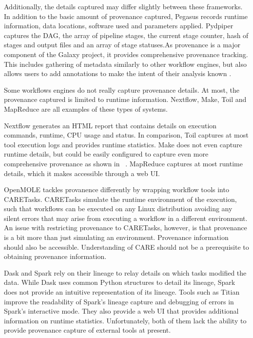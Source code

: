 \documentclass{report}
\begin{document}
            Additionally, the details captured may differ slightly between 
            these frameworks. In addition to the basic amount of  provenance 
            captured, Pegasus records runtime information, data locations, 
            software used and parameters applied. Pydpiper captures the DAG, the 
            array of pipeline stages, the current stage counter, hash of stages 
            and output files and an array of stage statuses.As provenance is a 
            major component of the Galaxy project, it 
            provides comprehensive provenance tracking. This includes gathering
            of metadata similarly to other workflow engines, but also allows
            users to add annotations to make the intent of their analysis known
            .

            Some workflows engines do not really capture provenance details. At 
            most, the provenance captured is limited to runtime information.
            Nextflow, Make, Toil and MapReduce are all examples of these types
            of systems.

            Nextflow generates an
            HTML report that contains details on execution commands, runtime, 
            CPU usage and status. In comparison, Toil captures at most tool 
            execution logs and provides runtime 
            statistics. Make does not even capture runtime details, but could be
            easily configured to capture even more comprehensive provenance as
            shown in ~\cite{10.3389/fninf.2016.00002}. MapReduce captures at 
            most runtime details, which it makes accessible through a web UI.

            OpenMOLE tackles provanence differently by wrapping workflow tools
            into CARETasks. CARETasks simulate the runtime environment of the 
            execution, such that workflows can be executed on any Linux 
            distribution avoiding any silent errors that may arise from 
            executing a workflow in a different environment. An issue with 
            restricting provenance to CARETasks, however, is that provenance is
            a bit more than just simulating an environment. Provenance 
            information should also be accessible. Understanding of CARE should
            not be a prerequisite to obtaining provenance information.
                     
            Dask and Spark rely on their lineage to relay details on which 
            tasks modified the data. While Dask uses common Python structures to 
            detail its lineage, Spark does not provide an intuitive 
            representation of its lineage. Tools such as 
            Titian~\cite{interlandi2018adding} improve the readability of 
            Spark's lineage capture and  debugging of errors in 
            Spark's interactive mode. They also provide a web UI that provides
            additional information on runtime statistics. Unfortunately, both
            of them lack the ability to provide provenance capture of external
            tools at present.
\end{document}

